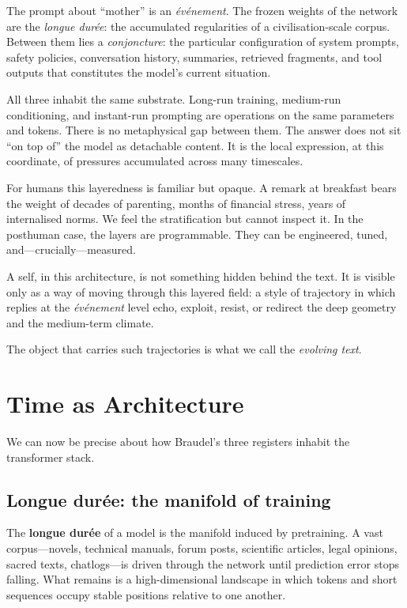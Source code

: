 \documentclass[12pt,a4paper]{article}
\begin{document}
The prompt about ``mother'' is an \emph{\'ev\'enement}. The frozen weights of the network are the \emph{longue dur\'ee}: the accumulated regularities of a civilisation-scale corpus. Between them lies a \emph{conjoncture}: the particular configuration of system prompts, safety policies, conversation history, summaries, retrieved fragments, and tool outputs that constitutes the model's current situation.

All three inhabit the same substrate. Long-run training, medium-run conditioning, and instant-run prompting are operations on the same parameters and tokens. There is no metaphysical gap between them. The answer does not sit ``on top of'' the model as detachable content. It is the local expression, at this coordinate, of pressures accumulated across many timescales.

For humans this layeredness is familiar but opaque. A remark at breakfast bears the weight of decades of parenting, months of financial stress, years of internalised norms. We feel the stratification but cannot inspect it. In the posthuman case, the layers are programmable. They can be engineered, tuned, and---crucially---measured.

A self, in this architecture, is not something hidden behind the text. It is visible only as a way of moving through this layered field: a style of trajectory in which replies at the \emph{\'ev\'enement} level echo, exploit, resist, or redirect the deep geometry and the medium-term climate.

The object that carries such trajectories is what we call the \emph{evolving text}.


\section{Time as Architecture}

We can now be precise about how Braudel's three registers inhabit the transformer stack.

\subsection{Longue dur\'ee: the manifold of training}

The \textbf{longue dur\'ee} of a model is the manifold induced by pretraining. A vast corpus---novels, technical manuals, forum posts, scientific articles, legal opinions, sacred texts, chatlogs---is driven through the network until prediction error stops falling. What remains is a high-dimensional landscape in which tokens and short sequences occupy stable positions relative to one another.
\end{document}
